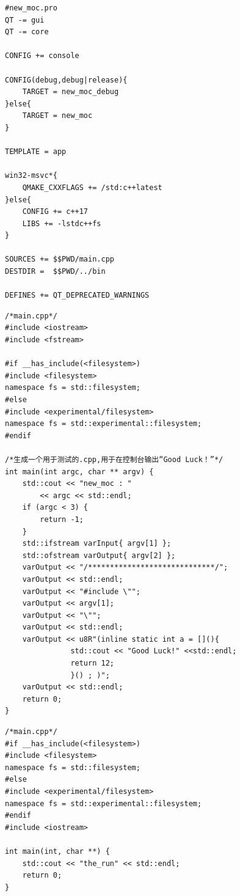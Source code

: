 \begin{lstlisting}[label=f00000b,
caption=GoodLuck,
title=\lstlistingname\ \thelstlisting
]
#new_moc.pro
QT -= gui
QT -= core

CONFIG += console

CONFIG(debug,debug|release){
    TARGET = new_moc_debug
}else{
    TARGET = new_moc
}

TEMPLATE = app

win32-msvc*{
    QMAKE_CXXFLAGS += /std:c++latest
}else{
    CONFIG += c++17
    LIBS += -lstdc++fs
}

SOURCES += $$PWD/main.cpp
DESTDIR =  $$PWD/../bin

DEFINES += QT_DEPRECATED_WARNINGS
\end{lstlisting}          %
\begin{lstlisting}[label=f00000c,
caption=GoodLuck,
title=\lstlistingname\ \thelstlisting
]
/*main.cpp*/
#include <iostream>
#include <fstream>

#if __has_include(<filesystem>)
#include <filesystem>
namespace fs = std::filesystem;
#else
#include <experimental/filesystem>
namespace fs = std::experimental::filesystem;
#endif

/*生成一个用于测试的.cpp,用于在控制台输出“Good Luck！”*/
int main(int argc, char ** argv) {
    std::cout << "new_moc : "
        << argc << std::endl;
    if (argc < 3) {
        return -1;
    }
    std::ifstream varInput{ argv[1] };
    std::ofstream varOutput{ argv[2] };
    varOutput << "/*****************************/";
    varOutput << std::endl;
    varOutput << "#include \"";
    varOutput << argv[1];
    varOutput << "\"";
    varOutput << std::endl;
    varOutput << u8R"(inline static int a = [](){
               std::cout << "Good Luck!" <<std::endl;
               return 12;
               }() ; )";
    varOutput << std::endl;
    return 0;
}
\end{lstlisting}          %

\begin{lstlisting}[label=f00000a,
caption=GoodLuck,
title=\lstlistingname\ \thelstlisting
]
/*main.cpp*/
#if __has_include(<filesystem>)
#include <filesystem>
namespace fs = std::filesystem;
#else
#include <experimental/filesystem>
namespace fs = std::experimental::filesystem;
#endif
#include <iostream>

int main(int, char **) {
    std::cout << "the_run" << std::endl;
    return 0;
}
\end{lstlisting}          %


